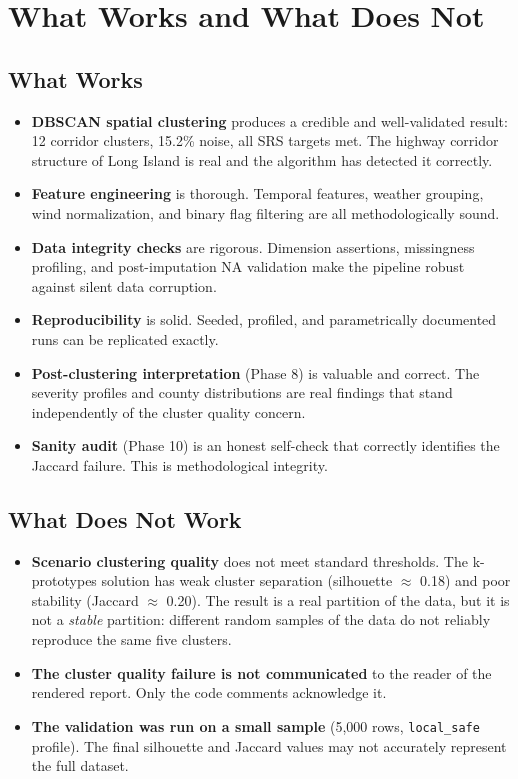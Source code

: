 \documentclass[11pt]{article}
\begin{document}
\section{What Works and What Does Not}

\subsection{What Works}

\begin{itemize}
\item \textbf{DBSCAN spatial clustering} produces a credible and well-validated
  result: 12 corridor clusters, 15.2\% noise, all SRS targets met. The highway
  corridor structure of Long Island is real and the algorithm has detected it
  correctly.
\item \textbf{Feature engineering} is thorough. Temporal features, weather
  grouping, wind normalization, and binary flag filtering are all methodologically
  sound.
\item \textbf{Data integrity checks} are rigorous. Dimension assertions, missingness
  profiling, and post-imputation NA validation make the pipeline robust against
  silent data corruption.
\item \textbf{Reproducibility} is solid. Seeded, profiled, and parametrically
  documented runs can be replicated exactly.
\item \textbf{Post-clustering interpretation} (Phase 8) is valuable and correct.
  The severity profiles and county distributions are real findings that stand
  independently of the cluster quality concern.
\item \textbf{Sanity audit} (Phase 10) is an honest self-check that correctly
  identifies the Jaccard failure. This is methodological integrity.
\end{itemize}

\subsection{What Does Not Work}

\begin{itemize}
\item \textbf{Scenario clustering quality} does not meet standard thresholds.
  The k-prototypes solution has weak cluster separation (silhouette $\approx$ 0.18)
  and poor stability (Jaccard $\approx$ 0.20). The result is a real partition
  of the data, but it is not a \textit{stable} partition: different random samples
  of the data do not reliably reproduce the same five clusters.
\item \textbf{The cluster quality failure is not communicated} to the reader
  of the rendered report. Only the code comments acknowledge it.
\item \textbf{The validation was run on a small sample} (5{,}000 rows,
  \texttt{local\_safe} profile). The final silhouette and Jaccard values may
  not accurately represent the full dataset.
\end{itemize}
\end{document}
